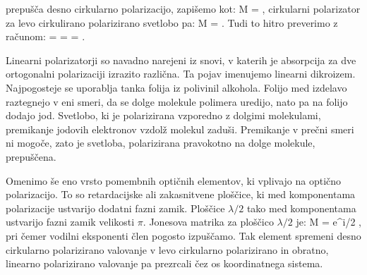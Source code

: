 prepušča desno cirkularno polarizacijo, zapišemo kot:
\beq
M = \left[\begin{array}{cc}
1 & i \\
-i & 1\\
\end{array}\right]\!\!, 
\label{eq:03_52}
\eeq
cirkularni polarizator za levo cirkulirano polarizirano svetlobo pa:
\beq
M = \left[\begin{array}{cc}
1 & -i \\
i & 1\\
\end{array}\right]\!\!.
\label{eq:03_53}
\eeq
Tudi to hitro preverimo z računom:
\beq
{} = \left[\begin{array}{cc}
1 & \pm i \\
\mp i & 1\\
\end{array}\right]\cdot 
\left[\begin{array}{c}
J_{1x}\\
J_{1y}\\
\end{array}\right]\!\! = 
\left[\begin{array}{c}
J_{1x} \pm i J_{1y}\\
\mp i J_{1x} + J_{1y}\\
\end{array}\right]\!\!=
\left[\begin{array}{c}
1\\
\mp i\\
\end{array}\right]\!\!.
\label{eq:03_54}
\eeq

\begin{remark}
Linearni polarizatorji so navadno narejeni iz snovi, v
katerih je absorpcija za dve ortogonalni polarizaciji izrazito različna.
Ta pojav imenujemo linearni dikroizem. Najpogosteje se uporablja
tanka folija iz polivinil alkohola. Folijo med izdelavo raztegnejo v
eni smeri, da se dolge molekule polimera uredijo, nato pa na folijo
dodajo jod. Svetlobo, ki je polarizirana vzporedno z dolgimi molekulami,
premikanje jodovih elektronov vzdolž molekul zaduši. Premikanje v prečni
smeri ni mogoče, zato je svetloba, polarizirana pravokotno na dolge
molekule, prepuščena. 
\end{remark}

Omenimo še eno vrsto pomembnih optičnih elementov, ki vplivajo na optično
polarizacijo. To so retardacijske ali zakasnitvene ploščice, ki med 
komponentama polarizacije ustvarijo dodatni fazni zamik. 
Ploščice $\lambda/2$ tako med komponentama
ustvarijo fazni zamik velikosti $\pi$. Jonesova matrika za ploščico $\lambda/2$ je:
\beq
M = e^{\pm i\pi/2}
\left[\begin{array}{cc}
1 & 0 \\
0 & -1\\
\end{array}\right]\!\!,
\label{eq:03_55}
\eeq
pri čemer vodilni eksponenti člen pogosto izpuščamo. 
Tak element spremeni desno cirkularno polarizirano valovanje v levo cirkularno polarizirano
in obratno, linearno polarizirano valovanje pa prezrcali čez os koordinatnega sistema.

